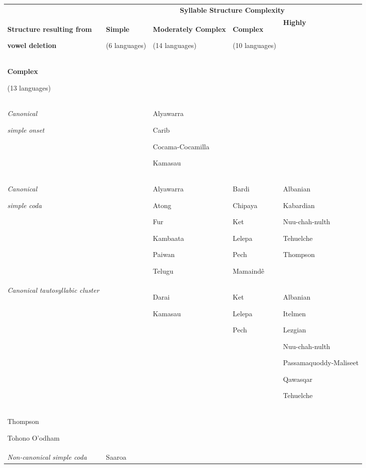 \begin{table}
\begin{tabularx}{\textwidth}{XXXXX}
\lsptoprule
 & \multicolumn{4}{c}{ \textbf{Syllable Structure Complexity}}\\
\textbf{Structure resulting from} 

\textbf{vowel deletion} & { \textbf{Simple}}

 (6 languages) &  \textbf{Moderately Complex}

 (14 languages) &  \textbf{Complex}

 (10 languages) &  \textbf{Highly} \\
\textbf{Complex}

 (13 languages)\\
\textit{Canonical} 

\textit{simple onset} &  & Alyawarra

Carib

Cocama-Cocamilla

Kamasau &  & \\
\textit{Canonical} 

\textit{simple coda} &  & Alyawarra

Atong

Fur

Kambaata

Paiwan

Telugu & Bardi

Chipaya

Ket

Lelepa

Pech

Mamaindê & Albanian

Kabardian

Nuu-chah-nulth

Tehuelche

Thompson\\
\textit{Canonical tautosyllabic cluster} &  & Darai

Kamasau & Ket

Lelepa

Pech & Albanian

Itelmen

Lezgian

Nuu-chah-nulth

Passamaquoddy-Maliseet

Qawasqar

Tehuelche\\
Thompson

Tohono O’odham\\
\textit{Non-canonical simple coda} & Saaroa


\end{tabularx}
\end{table}
